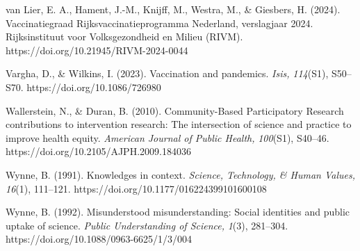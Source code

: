 \documentclass[authordate, empirical]{jote-new-article}
\begin{document}
	van Lier, E. A., Hament, J.-M., Knijff, M., Westra, M., \& Giesbers, H. (2024). Vaccinatiegraad Rijksvaccinatieprogramma Nederland, verslagjaar 2024. Rijksinstituut voor Volksgezondheid en Milieu (RIVM). https://doi.org/10.21945/RIVM-2024-0044



	Vargha, D., \& Wilkins, I. (2023). Vaccination and pandemics. \emph{Isis,} \emph{114}(S1), S50--S70. https://doi.org/10.1086/726980



	Wallerstein, N., \& Duran, B. (2010). Community-Based Participatory Research contributions to intervention research: The intersection of science and practice to improve health equity. \emph{American Journal of Public Health,} \emph{100}(S1), S40--46. https://doi.org/10.2105/AJPH.2009.184036



	Wynne, B. (1991). Knowledges in context. \emph{Science, Technology, \& Human Values,} \emph{16}(1), 111--121. https://doi.org/10.1177/016224399101600108



	Wynne, B. (1992). Misunderstood misunderstanding: Social identities and public uptake of science. \emph{Public Understanding of Science,} \emph{1}(3), 281--304. https://doi.org/10.1088/0963-6625/1/3/004
\end{document}

